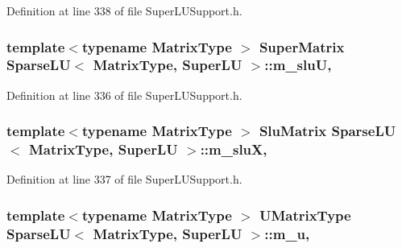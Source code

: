 Definition at line 338 of file Super\-L\-U\-Support.\-h.

\hypertarget{class_sparse_l_u_3_01_matrix_type_00_01_super_l_u_01_4_ad16d9d6b6338e16f12316e26242b9585}{
\subsubsection[{m\-\_\-slu\-U}]{\setlength{\rightskip}{0pt plus 5cm}template$<$typename Matrix\-Type $>$ Super\-Matrix {\bf Sparse\-L\-U}$<$ Matrix\-Type, {\bf Super\-L\-U} $>$\-::m\-\_\-slu\-U\hspace{0.3cm}{\ttfamily [mutable]}, {\ttfamily [protected]}}}\label{class_sparse_l_u_3_01_matrix_type_00_01_super_l_u_01_4_ad16d9d6b6338e16f12316e26242b9585}


Definition at line 336 of file Super\-L\-U\-Support.\-h.

\hypertarget{class_sparse_l_u_3_01_matrix_type_00_01_super_l_u_01_4_a258b16a8e33706027a7d1be030c46870}{
\subsubsection[{m\-\_\-slu\-X}]{\setlength{\rightskip}{0pt plus 5cm}template$<$typename Matrix\-Type $>$ {\bf Slu\-Matrix} {\bf Sparse\-L\-U}$<$ Matrix\-Type, {\bf Super\-L\-U} $>$\-::m\-\_\-slu\-X\hspace{0.3cm}{\ttfamily [mutable]}, {\ttfamily [protected]}}}\label{class_sparse_l_u_3_01_matrix_type_00_01_super_l_u_01_4_a258b16a8e33706027a7d1be030c46870}


Definition at line 337 of file Super\-L\-U\-Support.\-h.

\hypertarget{class_sparse_l_u_3_01_matrix_type_00_01_super_l_u_01_4_ac97819e7370a01935c33b6309df603fb}{
\subsubsection[{m\-\_\-u}]{\setlength{\rightskip}{0pt plus 5cm}template$<$typename Matrix\-Type $>$ {\bf U\-Matrix\-Type} {\bf Sparse\-L\-U}$<$ Matrix\-Type, {\bf Super\-L\-U} $>$\-::m\-\_\-u\hspace{0.3cm}{\ttfamily [mutable]}, {\ttfamily [protected]}}}\label{class_sparse_l_u_3_01_matrix_type_00_01_super_l_u_01_4_ac97819e7370a01935c33b6309df603fb}


